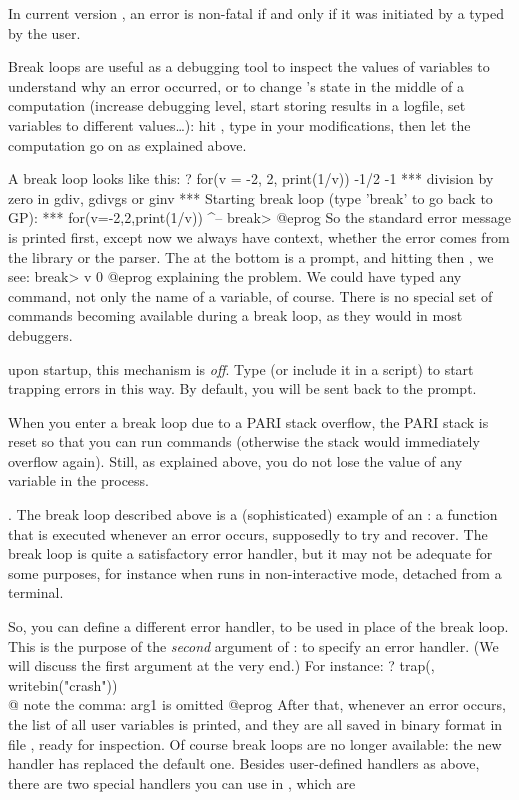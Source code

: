 In current version \vers, an error is non-fatal if and only if it was
initiated by a  typed by the user.

Break loops are useful as a debugging tool to inspect the values of 
variables to understand why an error occurred, or to change 's state in the
middle of a computation (increase debugging level, start storing results in a
logfile, set variables to different values\dots): hit , type in your
modifications, then let the computation go on as explained above.

A break loop looks like this:
\bprog
? for(v = -2, 2, print(1/v))
-1/2
-1
  ***   division by zero in gdiv, gdivgs or ginv
  ***   Starting break loop (type 'break' to go back to GP):
  ***   for(v=-2,2,print(1/v))
                            ^--
break>
@eprog
\noindent So the standard error message is printed first, except now we always
have context, whether the error comes from the library or the parser. The
 at the bottom is a prompt, and hitting  then
, we see:
\bprog
break> v
0
@eprog
\noindent explaining the problem. We could have typed any  command, not
only the name of a variable, of course. There is no special set of commands
becoming available during a break loop, as they would in most debuggers.

 upon startup, this mechanism is \emph{off}. Type
 (or include it in a script) to start trapping errors in this
way. By default, you will be sent back to the prompt.

 When you enter a break loop due to a PARI stack
overflow, the PARI stack is reset so that you can run commands (otherwise the
stack would immediately overflow again). Still, as explained above, you do
not lose the value of any  variable in the process.

. The break loop described above is a (sophisticated)
example of an : a function that is executed whenever an
error occurs, supposedly to try and recover. The break loop is quite a
satisfactory error handler, but it may not be adequate for some purposes, for
instance when  runs in non-interactive mode, detached from a
terminal.

So, you can define a different error handler, to be used in place of the
break loop. This is the purpose of the \emph{second} argument of :
to specify an error handler. (We will discuss the first argument at the very
end.) For instance:
\bprog
  ? trap(, writebin("crash"))  \\@ note the comma: arg1 is omitted
@eprog
\noindent After that, whenever an error occurs, the list of all user
variables is printed, and they are all saved in binary format in file
, ready for inspection. Of course break loops are no longer
available: the new handler has replaced the default one. Besides user-defined
handlers as above, there are two special handlers you can use in ,
which are

